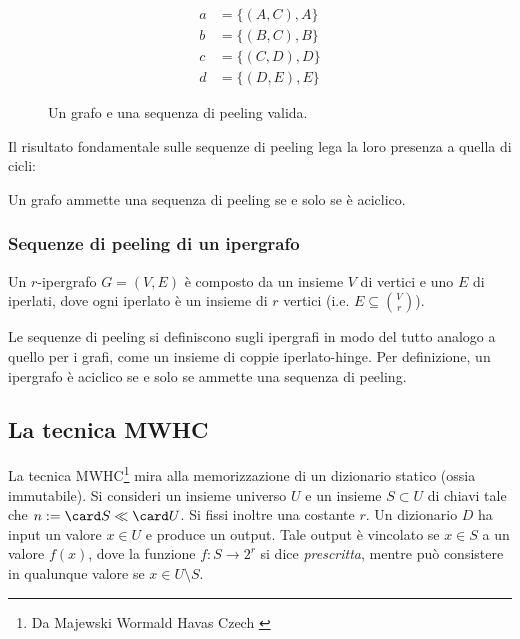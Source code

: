 \begin{figure}[ht]
	\begin{center}
		\begin{subfigure}[b]{0.45\textwidth}
			\begin{center}
				
			\end{center}
		\end{subfigure}
		\begin{subfigure}[b]{0.45\textwidth}
			\begin{center}
				\begin{align*}
					a & = \{(A, C), A\} \\
					b & = \{(B, C), B\} \\
					c & = \{(C, D), D\} \\
					d & = \{(D, E), E\}
				\end{align*}
			\end{center}
		\end{subfigure}
	\end{center}
	\caption{Un grafo e una sequenza di peeling valida.}%
	\label{fig:example_peeling}
\end{figure}

Il risultato fondamentale sulle sequenze di peeling lega la loro presenza a quella di cicli:
\begin{theorem}
	Un grafo ammette una sequenza di peeling se e solo se è aciclico.
\end{theorem}

\subsubsection{Sequenze di peeling di un ipergrafo}
Un $r$-ipergrafo $G=(V,E)$ è composto da un insieme $V$ di vertici e uno $E$ di iperlati, dove ogni iperlato è un insieme di $r$ vertici (i.e. $E \subseteq {V \choose r}$).

Le sequenze di peeling si definiscono sugli ipergrafi in modo del tutto analogo a quello per i grafi, come un insieme di coppie iperlato-hinge. Per definizione, un ipergrafo è aciclico se e solo se ammette una sequenza di peeling.



\subsection{La tecnica MWHC}
La tecnica MWHC\footnote{Da Majewski Wormald Havas Czech \cite{Majewski:96:MWHC}} mira alla memorizzazione di un dizionario statico (ossia immutabile).
Si consideri un insieme universo $U$ e un insieme $S\subset U$ di chiavi tale che $n:=\card S\ll\card U$. Si fissi inoltre una costante $r$.
Un dizionario $D$ ha input un valore $x\in U$ e produce un output. Tale output è vincolato se $x\in S$ a un valore $f(x)$, dove la funzione $f:S\to 2^r$ si dice \emph{prescritta}, mentre può consistere in qualunque valore se $x\in U\setminus S$.

